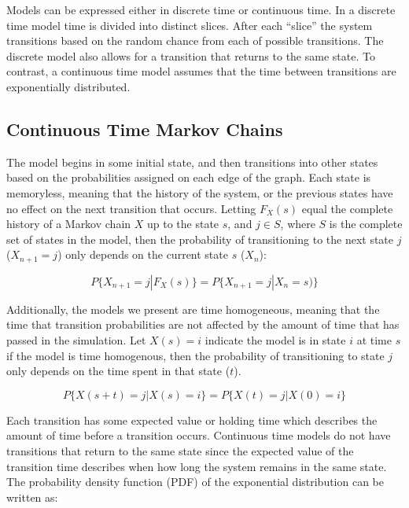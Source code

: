 Models can be expressed either in discrete time or continuous time. In a discrete time model
time is divided into distinct slices. After each ``slice'' the system transitions
based on the random chance from each of possible transitions. The discrete model
also allows for a transition that returns to the same state. To contrast, a continuous time model assumes that the time between transitions
are exponentially distributed. 

\subsection{Continuous Time Markov Chains}

The model begins in some initial state, and then transitions into other states based on the probabilities assigned on each edge of the graph. Each state is memoryless, meaning that the history of the system, or the previous states have no effect on the next transition that occurs. Letting $F_X(s)$ equal the complete history of a Markov chain $X$ up to the state $s$, and $j \in S$, where $S$ is the complete set of states in the model, then the probability of transitioning to the next state $j$ ($X_{n+1}=j$) only depends on the current state $s$ ($X_{n}$): \cite{MARKOV2} 

\begin{equation}
P\{ X_{n+1}=j | F_{X}(s) \} = P\{ X_{n+1}=j | X_{n} = s) \}
\end{equation}


Additionally, the models we present are time homogeneous, meaning that the time that transition probabilities are not affected by the amount of time that has passed in the simulation.
Let $X(s) = i$ indicate the model is in state $i$ at time $s$ if the model is time homogenous, then the probability of transitioning to state $j$ only depends on the time spent in that
state ($t$).

\begin{equation}
P\{ X(s+t)=j | X(s) = i \} = P\{ X(t)=j | X(0) = i \}
\end{equation}


Each transition has some expected value or holding time which describes the amount of time before a transition occurs. Continuous
time models do not have transitions that return to the same state since the
expected value of the transition time describes when how long the system 
remains in the same state. The probability density
function (PDF) of the exponential distribution can be written as: \cite{MARKOV1}

